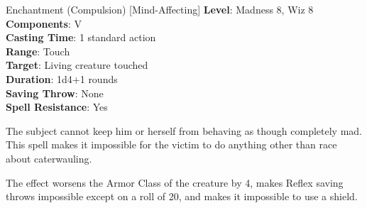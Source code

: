 {Enchantment (Compulsion) [Mind-Affecting]}
{
	\textbf{Level}: Madness 8, Wiz 8\\
	\textbf{Components}: V\\
	\textbf{Casting Time}: 1 standard action\\
	\textbf{Range}: Touch\\
	\textbf{Target}: Living creature touched\\
	\textbf{Duration}: 1d4+1 rounds\\
	\textbf{Saving Throw}: None\\
	\textbf{Spell Resistance}: Yes\\
}
{
	The subject cannot keep him or herself from behaving as though completely mad. This spell makes it impossible for the victim to do anything other than race about caterwauling.

	The effect worsens the Armor Class of the creature by 4, makes Reflex saving throws impossible except on a roll of 20, and makes it impossible to use a shield.
}